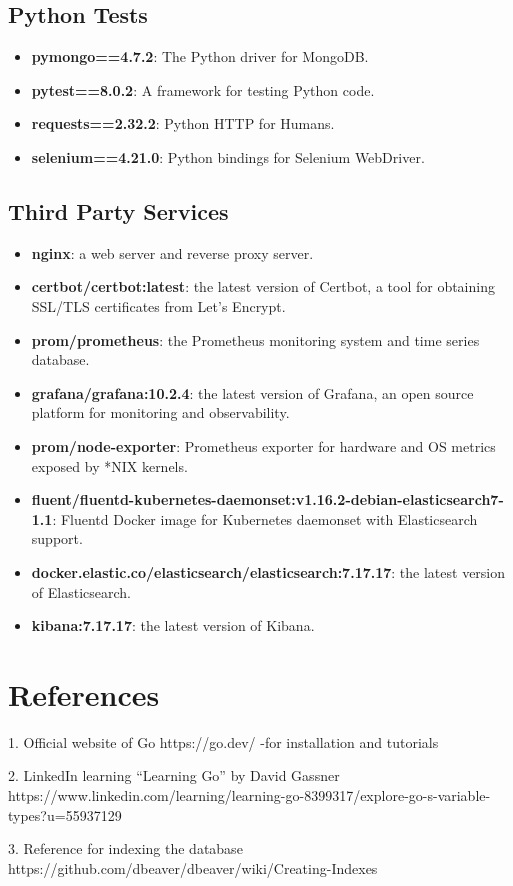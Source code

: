 \documentclass{article}
\begin{document}
\subsection*{Python Tests}
\begin{itemize}
    \item \textbf{pymongo==4.7.2}: The Python driver for MongoDB.
    \item \textbf{pytest==8.0.2}: A framework for testing Python code.
    \item \textbf{requests==2.32.2}: Python HTTP for Humans.
    \item \textbf{selenium==4.21.0}: Python bindings for Selenium WebDriver.
\end{itemize}

\subsection*{Third Party Services}
\begin{itemize}
    \item \textbf{nginx}: a web server and reverse proxy server.
    \item \textbf{certbot/certbot:latest}: the latest version of Certbot, a tool for obtaining SSL/TLS certificates from Let's Encrypt.
    \item \textbf{prom/prometheus}: the Prometheus monitoring system and time series database.
    \item \textbf{grafana/grafana:10.2.4}: the latest version of Grafana, an open source platform for monitoring and observability.
    \item \textbf{prom/node-exporter}: Prometheus exporter for hardware and OS metrics exposed by *NIX kernels.
    \item \textbf{fluent/fluentd-kubernetes-daemonset:v1.16.2-debian-elasticsearch7-1.1}: Fluentd Docker image for Kubernetes daemonset with Elasticsearch support.
    \item \textbf{docker.elastic.co/elasticsearch/elasticsearch:7.17.17}: the latest version of Elasticsearch.
    \item \textbf{kibana:7.17.17}: the latest version of Kibana.
\end{itemize}

\clearpage
\section{References}

1. Official website of Go https://go.dev/
-for installation and tutorials

2. LinkedIn learning “Learning Go” by David Gassner
https://www.linkedin.com/learning/learning-go-8399317/explore-go-s-variable-types?u=55937129

3. Reference for indexing the database
https://github.com/dbeaver/dbeaver/wiki/Creating-Indexes
\end{document}
